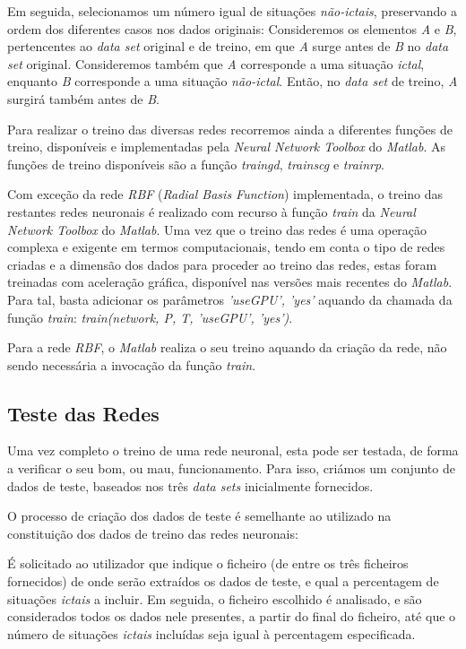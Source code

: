 \documentclass{article}
\begin{document}
Em seguida, selecionamos um número igual de situações \emph{não-ictais}, preservando a ordem dos diferentes casos nos dados originais: Consideremos os elementos \emph{A} e \emph{B}, pertencentes ao \emph{data set} original e de treino, em que \emph{A} surge antes de \emph{B} no \emph{data set} original. Consideremos também que \emph{A} corresponde a uma situação \emph{ictal}, enquanto \emph{B} corresponde a uma situação \emph{não-ictal}. Então, no \emph{data set} de treino, \emph{A} surgirá também antes de \emph{B}.

Para realizar o treino das diversas redes recorremos ainda a diferentes funções de treino, disponíveis e implementadas pela \emph{Neural Network Toolbox} do \emph{Matlab}. As funções de treino disponíveis são a função \emph{traingd}, \emph{trainscg} e \emph{trainrp}.

Com exceção da rede \emph{RBF} (\emph{Radial Basis Function}) implementada, o treino das restantes redes neuronais é realizado com recurso à função \emph{train} da \emph{Neural Network Toolbox} do \emph{Matlab}. Uma vez que o treino das redes é uma operação complexa e exigente em termos computacionais, tendo em conta o tipo de redes criadas e a dimensão dos dados para proceder ao treino das redes, estas foram treinadas com aceleração gráfica, disponível nas versões mais recentes do \emph{Matlab}. Para tal, basta adicionar os parâmetros \emph{'useGPU', 'yes'} aquando da chamada da função \emph{train}: \emph{train(network, P, T, 'useGPU', 'yes')}.

Para a rede \emph{RBF}, o \emph{Matlab} realiza o seu treino aquando da criação da rede, não sendo necessária a invocação da função \emph{train}.

\subsection{Teste das Redes}

Uma vez completo o treino de uma rede neuronal, esta pode ser testada, de forma a verificar o seu bom, ou mau, funcionamento. Para isso, criámos um conjunto de dados de teste, baseados nos três \emph{data sets} inicialmente fornecidos.

O processo de criação dos dados de teste é semelhante ao utilizado na constituição dos dados de treino das redes neuronais:

É solicitado ao utilizador que indique o ficheiro (de entre os três ficheiros fornecidos) de onde serão extraídos os dados de teste, e qual a percentagem de situações \emph{ictais} a incluir. Em seguida, o ficheiro escolhido é analisado, e são considerados todos os dados nele presentes, a partir do final do ficheiro, até que o número de situações \emph{ictais} incluídas seja igual à percentagem especificada.
\end{document}
